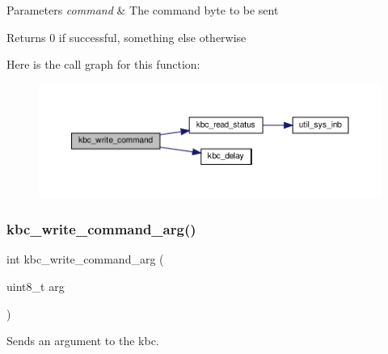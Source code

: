 \begin{DoxyParams}{Parameters}
{\em command} & The command byte to be sent \\
\hline
\end{DoxyParams}
\begin{DoxyReturn}{Returns}
0 if successful, something else otherwise 
\end{DoxyReturn}
Here is the call graph for this function\+:\nopagebreak
\begin{figure}[H]
\begin{center}
\leavevmode
\includegraphics[width=350pt]{group__kbc_ga8c467e640bc33719fe3ed7bcb73f2121_cgraph}
\end{center}
\end{figure}
\mbox{\label{group__kbc_ga24f1a4d1bcb60a73ebd6cee462191a52}} 
\subsubsection{\texorpdfstring{kbc\+\_\+write\+\_\+command\+\_\+arg()}{kbc\_write\_command\_arg()}}
{\footnotesize\ttfamily int kbc\+\_\+write\+\_\+command\+\_\+arg (\begin{DoxyParamCaption}\item[{uint8\+\_\+t}]{arg }\end{DoxyParamCaption})}



Sends an argument to the kbc. 


